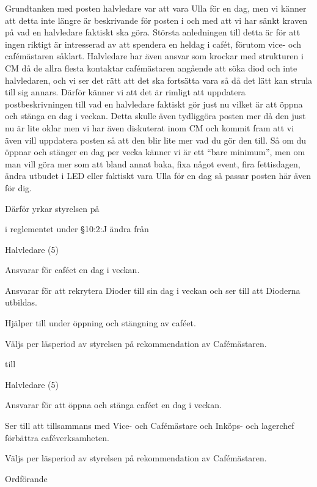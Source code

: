 \documentclass[../_main/handlingar.tex]{subfiles}
\begin{document}

Grundtanken med posten halvledare var att vara Ulla för en dag, men vi känner att detta inte längre är beskrivande för posten i och med att vi har sänkt kraven på vad en halvledare faktiskt ska göra. 
Största anledningen till detta är för att ingen riktigt är intresserad av att spendera en heldag i cafét, förutom vice- och cafémästaren såklart. 
Halvledare har även ansvar som krockar med strukturen i CM då de allra flesta kontaktar cafémästaren angående att söka diod och inte halvledaren, och vi ser det rätt att det ska fortsätta vara så då det lätt kan strula till sig annars. 
Därför känner vi att det är rimligt att uppdatera postbeskrivningen till vad en halvledare faktiskt gör just nu vilket är att öppna och stänga en dag i veckan. 
Detta skulle även tydliggöra posten mer då den just nu är lite oklar men vi har även diskuterat inom CM och kommit fram att vi även vill uppdatera posten så att den blir lite mer vad du gör den till. 
Så om du öppnar och stänger en dag per vecka känner vi är ett “bare minimum”, men om man vill göra mer som att bland annat baka, fixa något event, fira fettisdagen, ändra utbudet i LED eller faktiskt vara Ulla för en dag så passar posten här även för dig.

Därför yrkar styrelsen på

\begin{attsatser}
    \att i reglementet under \S10:2:J ändra från
    \begin{emptylist}
        \item Halvledare (5)
        \begin{dashlist}
            \item Ansvarar för caféet en dag i veckan. 
            \item Ansvarar för att rekrytera Dioder till sin dag i veckan och ser till att Dioderna utbildas.
            \item Hjälper till under öppning och stängning av caféet.
            \item Väljs per läsperiod av styrelsen på rekommendation av Cafémästaren.
        \end{dashlist}
    \end{emptylist}

    till

    \begin{emptylist}
        \item Halvledare (5)
        \begin{dashlist}
            \item Ansvarar för att öppna och stänga caféet en dag i veckan.
            \item Ser till att tillsammans med Vice- och Cafémästare och Inköps- och lagerchef förbättra caféverksamheten.
            \item Väljs per läsperiod av styrelsen på rekommendation av Cafémästaren.
        \end{dashlist}
    \end{emptylist}

\end{attsatser}

\begin{signatures}{1}
    \ist
    \signature{\ordf}{Ordförande}
\end{signatures}
\end{document}
